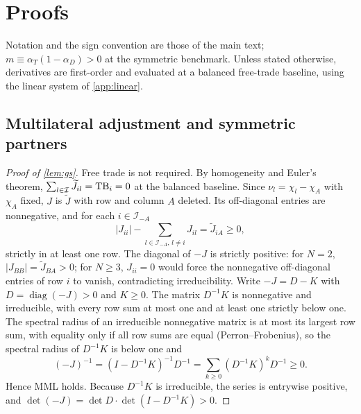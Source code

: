 \section{Proofs}
\label{app:proofs}

Notation and the sign convention are those of the main text; $m\equiv\alpha_T(1-\alpha_D)>0$ at the symmetric benchmark. Unless stated otherwise, derivatives are first-order and evaluated at a balanced free-trade baseline, using the linear system of \cref{app:linear}.

\subsection{Multilateral adjustment and symmetric partners}

\begin{proof}[Proof of \cref{lem:gs}]
Free trade is not required. By homogeneity and Euler's theorem, $\sum_{l\in\mathcal I}\widetilde J_{il}=\mathrm{TB}_i=0$ at the balanced baseline. Since $\nu_l=\chi_l-\chi_A$ with $\chi_A$ fixed, $J$ is $\widetilde J$ with row and column $A$ deleted. Its off-diagonal entries are nonnegative, and for each $i\in\mathcal I_{-A}$
\begin{equation*}
|J_{ii}|-\sum_{l\in\mathcal I_{-A},\,l\neq i}J_{il}=\widetilde J_{iA}\geq0,
\end{equation*}
strictly in at least one row. The diagonal of $-J$ is strictly positive: for $N=2$, $|J_{BB}|=\widetilde J_{BA}>0$; for $N\geq3$, $J_{ii}=0$ would force the nonnegative off-diagonal entries of row $i$ to vanish, contradicting irreducibility. Write $-J=D-K$ with $D=\operatorname{diag}(-J)>0$ and $K\geq0$. The matrix $D^{-1}K$ is nonnegative and irreducible, with every row sum at most one and at least one strictly below one. The spectral radius of an irreducible nonnegative matrix is at most its largest row sum, with equality only if all row sums are equal (Perron--Frobenius), so the spectral radius of $D^{-1}K$ is below one and
\begin{equation*}
(-J)^{-1}=(I-D^{-1}K)^{-1}D^{-1}=\sum_{k\geq0}(D^{-1}K)^kD^{-1}\geq0 .
\end{equation*}
Hence MML holds. Because $D^{-1}K$ is irreducible, the series is entrywise positive, and $\det(-J)=\det D\cdot\det(I-D^{-1}K)>0$.
\end{proof}

